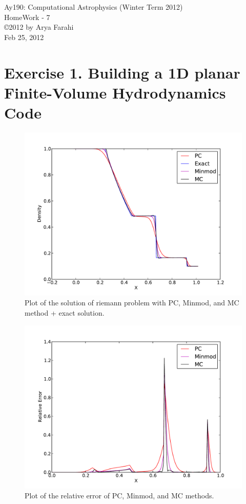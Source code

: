 \documentclass[10pt]{article}
\begin{document}
\begin{center}
{\large Ay190: Computational Astrophysics (Winter Term 2012)} \\
{\large HomeWork - 7 } \\
\copyright 2012 by Arya Farahi \\
Feb 25, 2012
\end{center}

\section{Exercise 1. Building a 1D planar Finite-Volume Hydrodynamics Code}


\begin{figure}[hbt]
  \begin{center}
    \includegraphics[scale=0.4]{Plots/plot1.pdf}
    \caption{\label{fig:1} Plot of the solution of riemann problem with PC, Minmod, and MC method + exact solution.}
  \end{center}
\end{figure}

\begin{figure}[hbt]
  \begin{center}
    \includegraphics[scale=0.4]{Plots/plot2.pdf}
    \caption{\label{fig:2} Plot of the relative error of PC, Minmod, and MC methods.}
  \end{center}
\end{figure}
\end{document}
